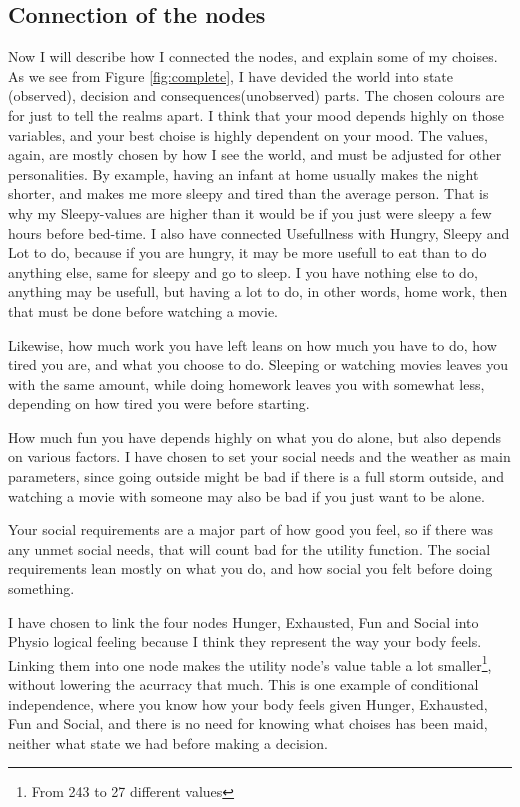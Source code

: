 \subsection{Connection of the nodes}
Now I will describe how I connected the nodes, and explain some of my choises.
As we see from Figure \ref{fig:complete}, I have devided the world into state
(observed), decision and consequences(unobserved) parts. The chosen colours are
for just to tell the realms apart. I think that your mood depends highly on
those variables, and your best choise is highly dependent on your mood. The
values, again, are mostly chosen by how I see the world, and must be adjusted
for other personalities. By example, having an infant at home usually makes the
night shorter, and makes me more sleepy and tired than the average person. That
is why my Sleepy-values are higher than it would be if you just were sleepy a
few hours before bed-time. I also have connected Usefullness with Hungry, Sleepy
and Lot to do, because if you are hungry, it may be more usefull to eat than to
do anything else, same for sleepy and go to sleep. I you have nothing else to
do, anything may be usefull, but having a lot to do, in other words, home work,
then that must be done before watching a movie.

Likewise, how much work you have left leans on how much you have to do, how
tired you are, and what you choose to do. Sleeping or watching movies leaves you
with the same amount, while doing homework leaves you with somewhat less,
depending on how tired you were before starting.

How much fun you have depends highly on what you do alone, but also depends on
various factors. I have chosen to set your social needs and the weather as main
parameters, since going outside might be bad if there is a full storm outside,
and watching a movie with someone may also be bad if you just want to be alone.

Your social requirements are a major part of how good you feel, so if there was
any unmet social needs, that will count bad for the utility function. The social
requirements lean mostly on what you do, and how social you felt before doing
something.

I have chosen to link the four nodes Hunger, Exhausted, Fun and Social into
Physio logical feeling because I think they represent the way your body feels.
Linking them into one node makes the utility node's value table a lot
smaller\footnote{From 243 to 27 different values}, without lowering the acurracy
that much. This is one example of conditional
independence, where you know how your body feels given Hunger, Exhausted, Fun
and Social, and there is no need for knowing what choises has been maid,
neither what state we had before making a decision.

